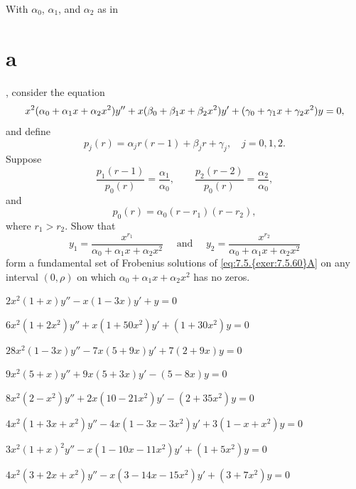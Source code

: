 \begin{exerciselist}
\begin{alist}
    \item %
    With $\alpha_{0}$, $\alpha_{1}$, and $\alpha_{2}$ as in \part{a}, consider the equation
    \setcounter{equation}{0}
    \begin{equation}
      \label{eq:7.5.{exer:7.5.60}A}x^{2}(\alpha_{0}+\alpha_{1}x+\alpha_{2}x^{2})y''+x(\beta_{0}+\beta_{1}x+\beta_{2}x^{2})y'+ (\gamma_{0}+\gamma_{1}x+\gamma_{2}x^{2})y=0,
    \end{equation}
    and define
    \[
      p_{j}(r)=\alpha_{j}r(r-1)+\beta_{j}r+\gamma_{j},\quad j=0,1,2.
    \]
    Suppose
    \[
      \frac{p_{1}(r-1)}{p_{0}(r)}= \frac{\alpha_{1}}{\alpha_{0}},\qquad \frac{p_{2}(r-2)}{p_{0}(r)}= \frac{\alpha_{2}}{\alpha_{0}},
    \]
    and
    \[
      p_{0}(r)=\alpha_{0}(r-r_{1})(r-r_{2}),
    \]
    where $r_{1}>r_{2}$. Show that
    \[
      y_{1}=\frac{x^{r_{1}}}{\alpha_{0}+\alpha_{1}x+\alpha_{2}x^{2}}\quad\mbox{ and }\quad y_{2}=\frac{x^{r_{2}}}{\alpha_{0}+\alpha_{1}x+\alpha_{2}x^{2}}
    \]
    form a fundamental set of Frobenius solutions of \eqref{eq:7.5.{exer:7.5.60}A} on any interval
    $(0,\rho)$ on which $\alpha_{0}+\alpha_{1}x+\alpha_{2}x^{2}$ has no zeros.
  \end{alist}


  \item\label{exer:7.5.61} $2x^{2}(1+x)y''-x(1-3x)y'+y=0$

  \item\label{exer:7.5.62} $6x^{2}(1+2x^{2})y''+x(1+50x^{2})y'+(1+30x^{2})y=0$

  \item\label{exer:7.5.63} $28x^{2}(1-3x)y''-7x(5+9x)y'+7(2+9x)y=0$

  \item\label{exer:7.5.64} $9x^{2}(5+x)y''+9x(5+3x)y'-(5-8x)y=0$

  \item\label{exer:7.5.65} $8x^{2}(2-x^{2})y''+2x(10-21x^{2})y'-(2+35x^{2})y=0$

  \item\label{exer:7.5.66} $4x^{2}(1+3x+x^{2})y''-4x(1-3x-3x^{2})y'+3(1-x+x^{2})y=0$

  \item\label{exer:7.5.67} $3x^{2}(1+x)^{2}y''-x(1-10x-11x^{2})y'+(1+5x^{2})y=0$

  \item\label{exer:7.5.68} $4x^{2}(3+2x+x^{2})y''-x(3-14x-15x^{2})y'+(3+7x^{2})y=0$
\end{exerciselist}
